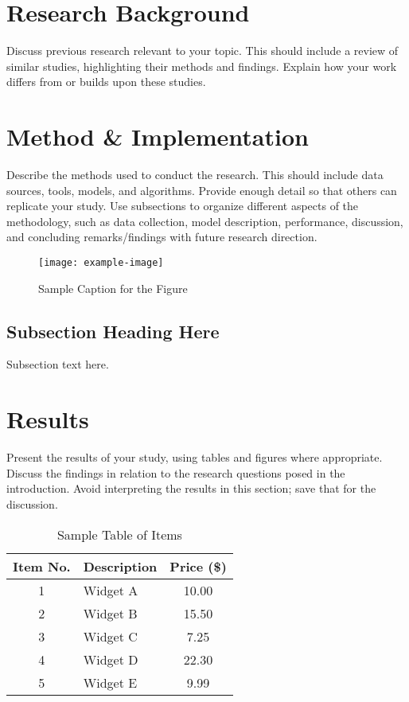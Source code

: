\documentclass{ReportStyle}
\begin{document}
\section{Research Background}
Discuss previous research relevant to your topic. This should include a review of similar studies, highlighting their methods and findings. Explain how your work differs from or builds upon these studies.


\section{Method \& Implementation}
Describe the methods used to conduct the research. This should include data sources, tools, models, and algorithms. Provide enough detail so that others can replicate your study.
Use subsections to organize different aspects of the methodology, such as data collection, model description, performance, discussion, and concluding remarks/findings with future research direction.

\begin{figure}[h]
    \centering
    \texttt{[image: example-image]} %
    \caption{Sample Caption for the Figure}
    \label{fig:sample_figure}
\end{figure}

\subsection{Subsection Heading Here}
Subsection text here.

\section{Results}
Present the results of your study, using tables and figures where appropriate. Discuss the findings in relation to the research questions posed in the introduction. Avoid interpreting the results in this section; save that for the discussion.

\begin{table}[h]
\centering
\caption{Sample Table of Items}
\label{tab:sample_table}
\begin{tabular}{|c|l|c|}
\hline
\textbf{Item No.} & \textbf{Description}        & \textbf{Price (\$)} \\ \hline
1                 & Widget A                    & 10.00               \\ \hline
2                 & Widget B                    & 15.50               \\ \hline
3                 & Widget C                    & 7.25                \\ \hline
4                 & Widget D                    & 22.30               \\ \hline
5                 & Widget E                    & 9.99                \\ \hline
\end{tabular}
\end{table}
\end{document}
